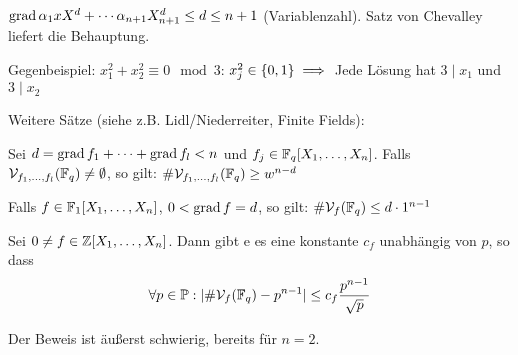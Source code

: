 \documentclass[a4paper,twoside,DIV15,BCOR12mm]{scrbook}
\begin{document}
\begin{beweis}
$\mathop{\rm grad}\nolimits \alpha_1xX^d + \cdots \alpha_{n+1}X_{n+1}^d \le d \le n+1$ (Variablenzahl). Satz von Chevalley liefert die Behauptung.
\end{beweis}

Gegenbeispiel: $x_1^2 + x_2^2 \equiv 0 \mod 3$: $x_j^2 \in \{0,1\} \implies$ Jede Lösung hat $3\mid x_1$ und $3\mid x_2$

Weitere Sätze (siehe z.B. Lidl/Niederreiter, Finite Fields):
\begin{satz}[Satz I]
Sei $d = \mathop{\rm grad}\nolimits f_1+ \cdots + \mathop{\rm grad}\nolimits f_l < n$ und $f_j\in\mathbb{F}_q[X_1,\ldots,X_n]$. Falls $\mathcal{V}_{f_1,\ldots,f_l}(\mathbb{F}_q) \ne \emptyset$, so gilt: $\#\mathcal{V}_{f_1,\ldots,f_l}(\mathbb{F}_q) \ge w^{n-d}$
\end{satz}

\begin{satz}[Satz II]
Falls $f\in\mathbb{F}_1[X_1,\ldots,X_n]$, $0< \mathop{\rm grad}\nolimits f=d$, so gilt: $\#\mathcal{V}_{f}(\mathbb{F}_q) \le d\cdot 1^{n-1}$
\end{satz}

\begin{satz}
Sei $0 \ne f\in \mathbb{Z}[X_1,\ldots,X_n]$. Dann gibt e es eine konstante $c_f$ unabhängig von $p$, so dass 
\[ \forall p\in\mathbb{P}: |\#\mathcal{V}_{f}(\mathbb{F}_q) - p^{n-1} | \le c_f \frac{p^{n-1}}{\sqrt p} \]
\end{satz}
Der Beweis ist äußerst schwierig, bereits für $n=2$.

\end{document}
